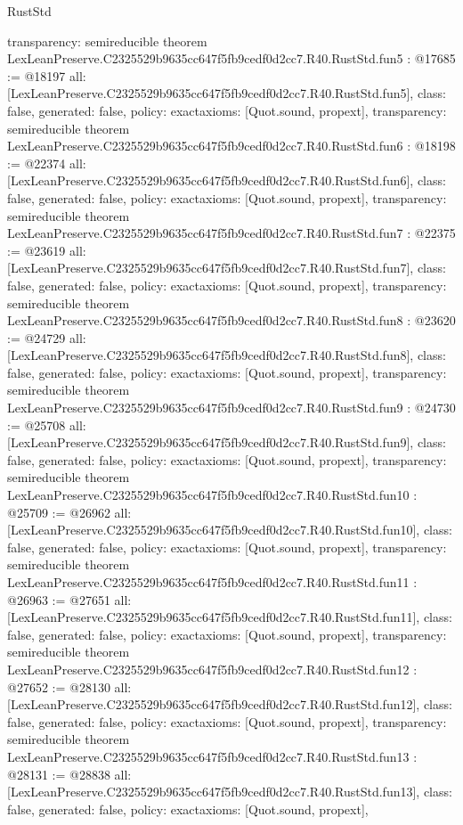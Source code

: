 \begin{lexlean}{RustStd}
\begin{coremodule}
{  transparency: semireducible
}
theorem LexLeanPreserve.C2325529b9635cc647f5fb9cedf0d2cc7.R40.RustStd.fun5 : @17685 := @18197 {
  all: [LexLeanPreserve.C2325529b9635cc647f5fb9cedf0d2cc7.R40.RustStd.fun5],
  class: false,
  generated: false,
  policy: exact{axioms: [Quot.sound, propext]},
  transparency: semireducible
}
theorem LexLeanPreserve.C2325529b9635cc647f5fb9cedf0d2cc7.R40.RustStd.fun6 : @18198 := @22374 {
  all: [LexLeanPreserve.C2325529b9635cc647f5fb9cedf0d2cc7.R40.RustStd.fun6],
  class: false,
  generated: false,
  policy: exact{axioms: [Quot.sound, propext]},
  transparency: semireducible
}
theorem LexLeanPreserve.C2325529b9635cc647f5fb9cedf0d2cc7.R40.RustStd.fun7 : @22375 := @23619 {
  all: [LexLeanPreserve.C2325529b9635cc647f5fb9cedf0d2cc7.R40.RustStd.fun7],
  class: false,
  generated: false,
  policy: exact{axioms: [Quot.sound, propext]},
  transparency: semireducible
}
theorem LexLeanPreserve.C2325529b9635cc647f5fb9cedf0d2cc7.R40.RustStd.fun8 : @23620 := @24729 {
  all: [LexLeanPreserve.C2325529b9635cc647f5fb9cedf0d2cc7.R40.RustStd.fun8],
  class: false,
  generated: false,
  policy: exact{axioms: [Quot.sound, propext]},
  transparency: semireducible
}
theorem LexLeanPreserve.C2325529b9635cc647f5fb9cedf0d2cc7.R40.RustStd.fun9 : @24730 := @25708 {
  all: [LexLeanPreserve.C2325529b9635cc647f5fb9cedf0d2cc7.R40.RustStd.fun9],
  class: false,
  generated: false,
  policy: exact{axioms: [Quot.sound, propext]},
  transparency: semireducible
}
theorem LexLeanPreserve.C2325529b9635cc647f5fb9cedf0d2cc7.R40.RustStd.fun10 : @25709 := @26962 {
  all: [LexLeanPreserve.C2325529b9635cc647f5fb9cedf0d2cc7.R40.RustStd.fun10],
  class: false,
  generated: false,
  policy: exact{axioms: [Quot.sound, propext]},
  transparency: semireducible
}
theorem LexLeanPreserve.C2325529b9635cc647f5fb9cedf0d2cc7.R40.RustStd.fun11 : @26963 := @27651 {
  all: [LexLeanPreserve.C2325529b9635cc647f5fb9cedf0d2cc7.R40.RustStd.fun11],
  class: false,
  generated: false,
  policy: exact{axioms: [Quot.sound, propext]},
  transparency: semireducible
}
theorem LexLeanPreserve.C2325529b9635cc647f5fb9cedf0d2cc7.R40.RustStd.fun12 : @27652 := @28130 {
  all: [LexLeanPreserve.C2325529b9635cc647f5fb9cedf0d2cc7.R40.RustStd.fun12],
  class: false,
  generated: false,
  policy: exact{axioms: [Quot.sound, propext]},
  transparency: semireducible
}
theorem LexLeanPreserve.C2325529b9635cc647f5fb9cedf0d2cc7.R40.RustStd.fun13 : @28131 := @28838 {
  all: [LexLeanPreserve.C2325529b9635cc647f5fb9cedf0d2cc7.R40.RustStd.fun13],
  class: false,
  generated: false,
  policy: exact{axioms: [Quot.sound, propext]},
}
\end{coremodule}
\end{lexlean}
